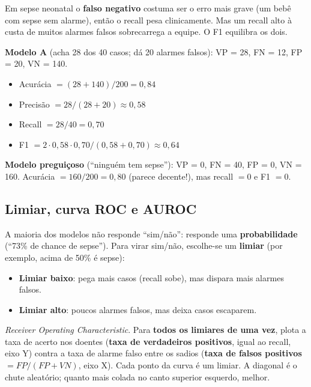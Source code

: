 \documentclass[11pt,a4paper]{article}
\begin{document}
Em sepse neonatal o \textbf{falso negativo} costuma ser o erro mais grave (um bebê com sepse sem alarme), então o recall pesa clinicamente. Mas um recall alto à custa de muitos alarmes falsos sobrecarrega a equipe. O F1 equilibra os dois.

\begin{exemplo}
\textbf{Modelo A} (acha 28 dos 40 casos; dá 20 alarmes falsos): VP = 28, FN = 12, FP = 20, VN = 140.
\begin{itemize}
  \item Acurácia $= (28+140)/200 = 0{,}84$
  \item Precisão $= 28/(28+20) \approx 0{,}58$
  \item Recall $= 28/40 = 0{,}70$
  \item F1 $= 2\cdot 0{,}58\cdot 0{,}70/(0{,}58+0{,}70) \approx 0{,}64$
\end{itemize}
\textbf{Modelo preguiçoso} (``ninguém tem sepse''): VP = 0, FN = 40, FP = 0, VN = 160.
Acurácia $= 160/200 = 0{,}80$ (parece decente!), mas recall $= 0$ e F1 $= 0$.
\end{exemplo}

\subsection{Limiar, curva ROC e AUROC}

A maioria dos modelos não responde ``sim/não'': responde uma \textbf{probabilidade} (``73\% de chance de sepse''). Para virar
sim/não, escolhe-se um \textbf{limiar} (por exemplo, acima de 50\% é sepse):
\begin{itemize}
  \item \textbf{Limiar baixo}: pega mais casos (recall sobe), mas dispara mais alarmes falsos.
  \item \textbf{Limiar alto}: poucos alarmes falsos, mas deixa casos escaparem.
\end{itemize}

\begin{conceito}
\emph{Receiver Operating Characteristic}. Para \textbf{todos os limiares de uma vez}, plota a taxa de acerto nos doentes
(\textbf{taxa de verdadeiros positivos}, igual ao recall, eixo Y) contra a taxa de alarme falso entre os sadios
(\textbf{taxa de falsos positivos} $= FP/(FP+VN)$, eixo X). Cada ponto da curva é um limiar.
A diagonal é o chute aleatório; quanto mais colada no canto superior esquerdo, melhor.
\end{conceito}
\end{document}
